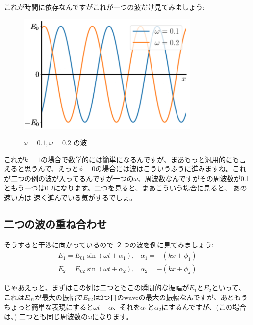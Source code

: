 これが時間に依存なんですがこれが一つの波だけ見てみましょう:
\begin{figure}[H]
   \centering
    \includegraphics[width=0.8\textwidth]{lesson6/w.pdf}
    \label{fig: 1}
    \begin{center}
        \caption{$\omega = 0.1, \omega = 0.2$ の波}
    \end{center}
\end{figure}

これが$k = 1$の場合で数学的には簡単になるんですが、まあもっと汎用的にも言えると思うんで、えっと$\phi=0$の場合には波はこういうふうに進みますね。これが二つの例の波が入ってるんですが一つの$\omega$、周波数なんですがその周波数が0.1ともう一つは0.2になります。二つを見ると、まあこういう場合に見ると、 
あの速い方は 速く進んでいる気がするでしょ。
\subsection{二つの波の重ね合わせ}
そうすると干渉に向かっているので ２つの波を例に見てみましょう:
\begin{equation}
\begin{array}{ll}
E_{1}=E_{01} \sin \left(\omega t+\alpha_{1}\right), & \alpha_{1}=-\left(k x+\phi_{1}\right) \\
E_{2}=E_{02} \sin \left(\omega t+\alpha_{2}\right), & \alpha_{2}=-\left(k x+\phi_{2}\right)
\end{array}
\end{equation}

じゃあえっと、まずはこの例は二つともこの瞬間的な振幅が$E_1$と$E_2$といって、これは$E_{01}$が最大の振幅で$E_{02}$は2つ目のwaveの最大の振幅なんですが、あともうちょっと簡単な表現にすると$\omega t + \alpha$、それを$\alpha_{1}$と$\alpha_{2}$にするんですが、(この場合は、) 二つとも同じ周波数の$\omega$になります。

